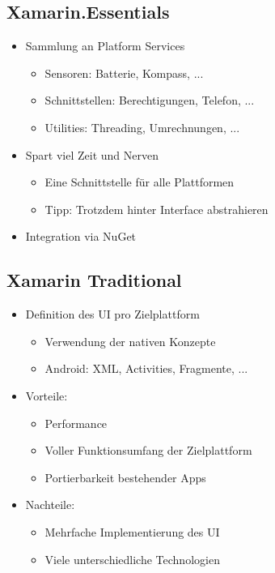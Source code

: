 \subsection{Xamarin.Essentials}
\begin{itemize}[topsep=0pt, leftmargin=4mm]
    \setlength\itemsep{-0.3em}
    \item Sammlung an Platform Services
    \begin{itemize}[topsep=0pt, leftmargin=4mm]
        \setlength\itemsep{-0.3em}
        \item Sensoren: Batterie, Kompass, ...
        \item Schnittstellen: Berechtigungen, Telefon, ...
        \item Utilities: Threading, Umrechnungen, ...
    \end{itemize}
    \item Spart viel Zeit und Nerven
    \begin{itemize}[topsep=0pt, leftmargin=4mm]
        \setlength\itemsep{-0.3em}
        \item Eine Schnittstelle für alle Plattformen
        \item Tipp: Trotzdem hinter Interface abstrahieren
    \end{itemize}
    \item Integration via NuGet
\end{itemize}
\subsection{Xamarin Traditional}
\begin{itemize}[topsep=0pt, leftmargin=4mm]
    \setlength\itemsep{-0.3em}
    \item Definition des UI pro Zielplattform
    \begin{itemize}[topsep=0pt, leftmargin=4mm]
        \setlength\itemsep{-0.3em}
        \item Verwendung der nativen Konzepte
        \item Android: XML, Activities, Fragmente, ...
    \end{itemize}
    \item Vorteile:
    \begin{itemize}[topsep=0pt, leftmargin=4mm]
        \setlength\itemsep{-0.3em}
        \item Performance
        \item Voller Funktionsumfang der Zielplattform
        \item Portierbarkeit bestehender Apps
    \end{itemize}
    \item Nachteile:
    \begin{itemize}[topsep=0pt, leftmargin=4mm]
        \setlength\itemsep{-0.3em}
        \item Mehrfache Implementierung des UI
        \item Viele unterschiedliche Technologien
    \end{itemize}
\end{itemize}
